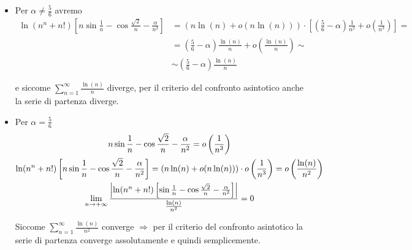 \begin{exbar}
\begin{example}
	\begin{itemize}
	\item Per $\alpha \neq \frac{5}{6}$ avremo
	\begin{align*}
		\ln(n^n + n!) \left[ n \sin{\frac{1} {n}} - \cos{\frac{\sqrt{2}} {n}} - \frac{\alpha} {n^2} \right] 
		&= \left( n\ln(n) + o(n\ln(n)) \right) \cdot \left[ \left(\frac{5} {6} - \alpha \right) \frac{1} {n^2} + o \left( \frac{1} {n^3} \right) \right] =
		\\
		&= \left( \frac{5}{6} - \alpha \right)  \frac{\ln(n)}{n} + o \left( \frac{\ln(n)}{n} \right) \sim
		\\
		&\sim \left(\frac{5} {6} - \alpha \right) \frac{\ln(n)} {n}
	\end{align*}
	
	e siccome $\sum_{n=1}^{\infty} \frac{\ln(n)}{n}$ diverge, per il criterio del confronto asintotico anche la serie di partenza diverge.
	
	\item Per $\alpha= \frac{5}{6}$
	\begin{gather*}
		n \sin{\frac{1} {n}} - \cos{\frac{\sqrt{2}} {n}} - \frac{\alpha} {n^2} = o \left( \frac{1} {n^3} \right)
		\\
		\ln(n^n + n!) \left[ n \sin{\frac{1} {n}} - \cos{\frac{\sqrt{2}} {n}} - \frac{\alpha} {n^2} \right] = (n\ln(n) + o(n\ln(n))) \cdot o \left( \frac{1} {n^3} \right) = o \left( \frac{\ln(n)} {n^2} \right)
		\\
		\lim_{n \rightarrow +\infty} \frac{ \left| \ln(n^n + n!) \left[ \sin{\frac{1} {n}} - \cos{\frac{\sqrt{2}} {n}} - \frac{\alpha} {n^2} \right] \right|} {\frac{\ln(n)} {n^2}} = 0
	\end{gather*}
	
	Siccome $\sum_{n=1}^{\infty} \frac{\ln(n)}{n^2}$ converge $\Rightarrow$ per il criterio del confronto asintotico la serie di partenza converge assolutamente e quindi semplicemente.
	\end{itemize}
\end{example}
\end{exbar}


